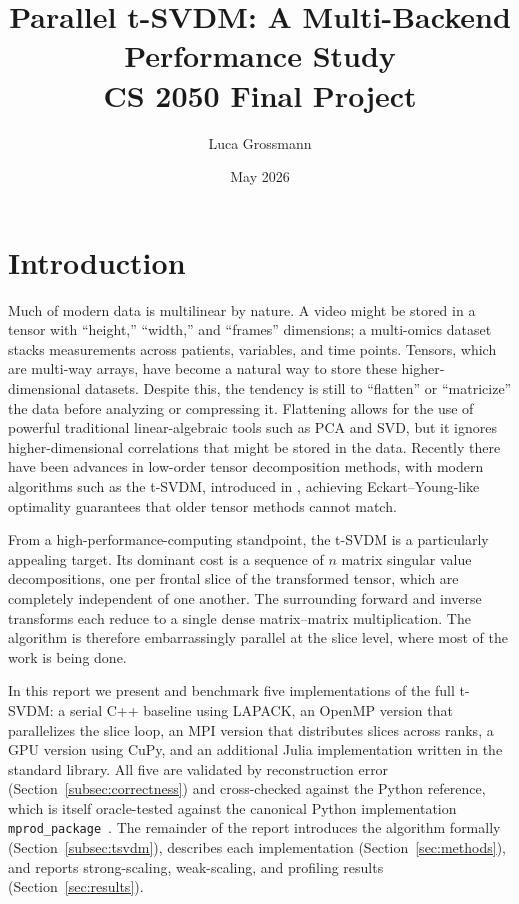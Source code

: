 \documentclass{article}
\title{Parallel t-SVDM: A Multi-Backend Performance Study \\
       \large CS 2050 Final Project}
\author{Luca Grossmann}
\date{May 2026}
\begin{document}
\maketitle

\section{Introduction}

Much of modern data is multilinear by nature. A video might be stored in a
tensor with ``height,'' ``width,'' and ``frames'' dimensions; a multi-omics
dataset stacks measurements across patients, variables, and time points.
Tensors, which are multi-way arrays, have become a natural way to store these
higher-dimensional datasets. Despite this, the tendency is still to
``flatten'' or ``matricize'' the data before analyzing or compressing it.
Flattening allows for the use of powerful traditional linear-algebraic tools
such as PCA and SVD, but it ignores higher-dimensional correlations that
might be stored in the data. Recently there have been advances in
low-order tensor decomposition methods, with modern algorithms such as the
t-SVDM, introduced in \cite{kilmer2021tensor}, achieving Eckart--Young-like
optimality guarantees that older tensor methods cannot match.

From a high-performance-computing standpoint, the t-SVDM is a particularly
appealing target. Its dominant cost is a sequence of $n$ matrix singular
value decompositions, one per frontal slice of the transformed tensor, which
are completely independent of one another. The surrounding forward and inverse
transforms each reduce to a single dense matrix--matrix multiplication. The
algorithm is therefore embarrassingly parallel at the slice level, where most of the work is being done. 

In this report we present and benchmark five implementations of the full
t-SVDM: a serial C++ baseline using LAPACK, an OpenMP version that
parallelizes the slice loop, an MPI version that distributes slices across
ranks, a GPU version using CuPy, and an additional Julia implementation
written in the standard library. All five are validated by reconstruction
error (Section~\ref{subsec:correctness}) and cross-checked against the
Python reference, which is itself oracle-tested against the canonical
Python implementation \texttt{mprod\_package}~\cite{kilmer2021tensor}.
The remainder of the report introduces the algorithm formally
(Section~\ref{subsec:tsvdm}), describes each implementation
(Section~\ref{sec:methods}), and reports strong-scaling, weak-scaling, and
profiling results (Section~\ref{sec:results}).
\end{document}
